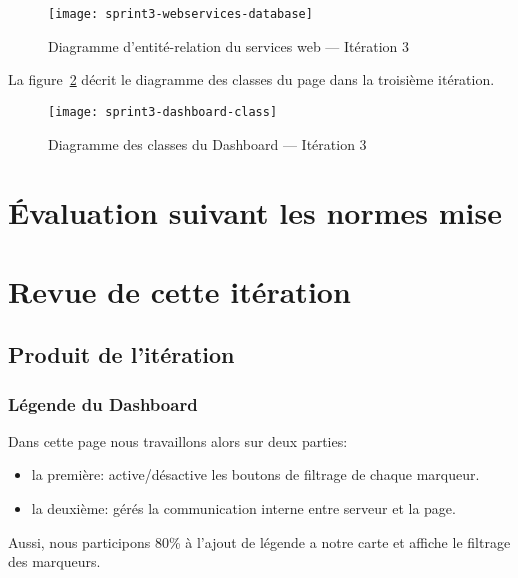 \begin{figure}[htbp]
    \centering
    \texttt{[image: sprint3-webservices-database]}
    \caption{Diagramme d'entité-relation du services web --- Itération 3}
\label{fig:sprint3-webservices-database}
\end{figure}

La figure~\ref{fig:sprint3-dashboard-classs} décrit le diagramme des classes du
page  dans la troisième itération.

\begin{figure}[htbp]
    \centering
    \texttt{[image: sprint3-dashboard-class]}
    \caption{Diagramme des classes du Dashboard --- Itération 3}
\label{fig:sprint3-dashboard-classs}
\end{figure}

\section{Évaluation suivant les normes mise}

\TODO{}

\section{Revue de cette itération}


\subsection{Produit de l'itération}

\subsubsection{Légende du Dashboard}
Dans cette page nous travaillons alors sur deux parties:

\begin{itemize}
    \item la première: active/désactive les boutons de filtrage de chaque
        marqueur.
    \item la deuxième: gérés la communication interne entre serveur et la page.
\end{itemize}

Aussi, nous participons 80\% à l'ajout de légende a notre carte et affiche le
filtrage des marqueurs.

